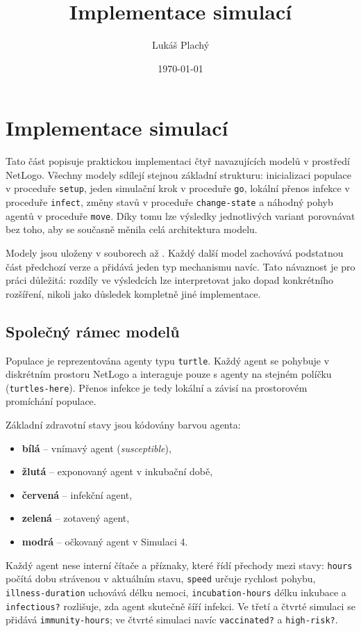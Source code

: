 \documentclass{article}
\title{Implementace simulací}
\author{Lukáš Plachý}
\date{\today}
\begin{document}
\maketitle

\section{Implementace simulací}

Tato část popisuje praktickou implementaci čtyř navazujících modelů v prostředí
NetLogo. Všechny modely sdílejí stejnou základní strukturu: inicializaci
populace v proceduře \texttt{setup}, jeden simulační krok v proceduře
\texttt{go}, lokální přenos infekce v proceduře \texttt{infect}, změny stavů
v proceduře \texttt{change-state} a náhodný pohyb agentů v proceduře
\texttt{move}. Díky tomu lze výsledky jednotlivých variant porovnávat bez toho,
aby se současně měnila celá architektura modelu.

Modely jsou uloženy v souborech  až
. Každý další model zachovává podstatnou část
předchozí verze a přidává jeden typ mechanismu navíc. Tato návaznost je pro
práci důležitá: rozdíly ve výsledcích lze interpretovat jako dopad konkrétního
rozšíření, nikoli jako důsledek kompletně jiné implementace.

\subsection{Společný rámec modelů}

Populace je reprezentována agenty typu \texttt{turtle}. Každý agent se pohybuje
v diskrétním prostoru NetLogo a interaguje pouze s agenty na stejném políčku
(\texttt{turtles-here}). Přenos infekce je tedy lokální a závisí na prostorovém
promíchání populace.

Základní zdravotní stavy jsou kódovány barvou agenta:
\begin{itemize}
\item \textbf{bílá} -- vnímavý agent (\textit{susceptible}),
\item \textbf{žlutá} -- exponovaný agent v inkubační době,
\item \textbf{červená} -- infekční agent,
\item \textbf{zelená} -- zotavený agent,
\item \textbf{modrá} -- očkovaný agent v Simulaci 4.
\end{itemize}

Každý agent nese interní čítače a příznaky, které řídí přechody mezi stavy:
\texttt{hours} počítá dobu strávenou v aktuálním stavu, \texttt{speed} určuje
rychlost pohybu, \texttt{illness-duration} uchovává délku nemoci,
\texttt{incubation-hours} délku inkubace a \texttt{infectious?} rozlišuje, zda
agent skutečně šíří infekci. Ve třetí a čtvrté simulaci se přidává
\texttt{immunity-hours}; ve čtvrté simulaci navíc \texttt{vaccinated?} a
\texttt{high-risk?}.
\end{document}
